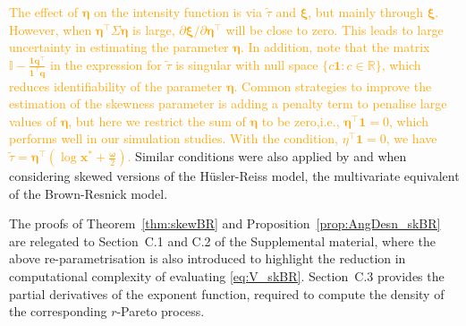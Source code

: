 \documentclass[12pt]{article}
\newcommand{\PZ}{\textcolor{orange}}
\begin{document}
\PZ{The effect of $\bm\eta$ on the intensity function is via $\tilde\tau$ and $\bm\xi$, but mainly through $\bm\xi$. However, when $\bm\eta^\top\Sigma\bm\eta$ is large, $\partial\bm\xi/\partial\bm\eta^\top$ will be close to zero. This leads to large uncertainty in estimating the parameter $\bm\eta$. In addition, note that the matrix $\mathbb{I} - \frac{\bm 1\bm q^\top}{\bm 1^\top \bm q}$ in the expression for $\tilde\tau$ is singular with null space $\{c\bm 1:c\in\mathbb R\}$, which reduces identifiability of the parameter $\bm \eta$. Common strategies to improve the estimation of the skewness parameter is adding a penalty term to penalise large values of $\bm\eta$, but here we restrict the sum of $\bm\eta$ to be zero,i.e., $\bm\eta^\top\bm 1 = 0$, which performs well in our simulation studies. With the condition, $\eta^\top\bm 1 = 0$, we have $\tilde\tau = \bm\eta^\top(\log \bm x^* + \frac{{\bm\omega}}{2})$.}   
Similar conditions were also applied by \citet{Padoan:2011} and \citet{Beranger.etal:2019} when considering skewed versions of the H\"{u}sler-Reiss model, the multivariate equivalent of the Brown-Resnick model. 

The proofs of Theorem~\ref{thm:skewBR} and Proposition~\ref{prop:AngDesn_skBR} are relegated to Section~C.1 and C.2 of the Supplemental material, where the above re-parametrisation is also introduced to highlight the reduction in computational complexity of evaluating \eqref{eq:V_skBR}. Section~C.3 provides the partial derivatives of the exponent function, required to compute the density of the corresponding $r$-Pareto process. 

\end{document}
